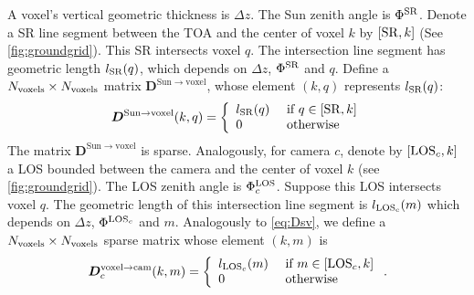 \documentclass[10pt,letterpaper]{article}
\newcommand{\OpDistance}{\bm{D}}
\begin{document}
A voxel's vertical geometric thickness is $\Delta z$.  The Sun zenith
angle is $\Phi^{\rm SR}$. Denote a SR line segment between the TOA and
the center of voxel $k$ by $[{\rm SR},k]$ (See
\cref{fig:groundgrid}). This SR intersects voxel $q$. The intersection
line segment has geometric length $l_{\rm SR}(q)$, which depends on
$\Delta z$, $\Phi^{\rm SR}$ and $q$.  Define a $N_{\rm voxels}\times
N_{\rm voxels}$ matrix $\OpDistance^{\mathrm{Sun \rightarrow voxel}}$,
whose element $(k,q)$ represents $l_{\rm SR}(q)$:
\begin{equation}
  \OpDistance^{\mathrm{Sun \rightarrow voxel}}(k,q) =
  \left\{
    \begin{array}{ll}
      l_{\rm SR}(q) & \mbox{ if $q \in[{\rm SR},k]$} \\
      0  & \mbox{ otherwise}
      \label{eq:Dsv}
    \end{array}
  \right.
  \hspace{-0.05cm}
\end{equation}
The matrix $\OpDistance^{\mathrm{Sun \rightarrow voxel}}$ is sparse.
Analogously, for camera $c$, denote by $[{\rm LOS}_c,k]$ a LOS bounded
between the camera and the center of voxel $k$ (see
\cref{fig:groundgrid}).  The LOS zenith angle is $\Phi^{\rm LOS}_c$.
Suppose this LOS intersects voxel $q$. The geometric length of this
intersection line segment is $l_{\rm LOS_c}(m)$ which depends on
$\Delta z$, $\Phi^{{\rm LOS}_c}$ and $m$.  Analogously to
\cref{eq:Dsv}, we define a $N_{\rm voxels}\times N_{\rm voxels}$
sparse matrix whose element $(k,m)$ is
\begin{equation}
  \OpDistance^{\mathrm{voxel \rightarrow cam}}_c(k,m) =
  \left\{
    \begin{array}{ll}
      l_{{\rm LOS}_c}(m) & \mbox{ if $m \in[{\rm LOS}_c,k]$} \\
      0  & \mbox{ otherwise}
      \label{eq:Dvc}
    \end{array}
  \right.
  .
  \hspace{-0.05cm}
\end{equation}
\end{document}
